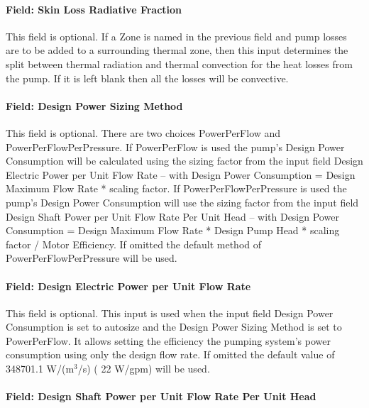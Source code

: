 \paragraph{Field: Skin Loss Radiative Fraction}\label{field-skin-loss-radiative-fraction-4}

This field is optional. If a Zone is named in the previous field and pump losses are to be added to a surrounding thermal zone, then this input determines the split between thermal radiation and thermal convection for the heat losses from the pump. If it is left blank then all the losses will be convective.

\paragraph{Field: Design Power Sizing Method}\label{field-design-power-sizing-method-4}

This field is optional. There are two choices PowerPerFlow and PowerPerFlowPerPressure. If PowerPerFlow is used the pump's Design Power Consumption will be calculated using the sizing factor from the input field Design Electric Power per Unit Flow Rate -- with Design Power Consumption = Design Maximum Flow Rate * scaling factor. If PowerPerFlowPerPressure is used the pump's Design Power Consumption will use the sizing factor from the input field Design Shaft Power per Unit Flow Rate Per Unit Head -- with Design Power Consumption = Design Maximum Flow Rate * Design Pump Head * scaling factor / Motor Efficiency. If omitted the default method of PowerPerFlowPerPressure will be used.

\paragraph{Field: Design Electric Power per Unit Flow Rate}\label{field-design-electric-power-per-unit-flow-rate-3}

This field is optional. This input is used when the input field Design Power Consumption is set to autosize and the Design Power Sizing Method is set to PowerPerFlow. It allows setting the efficiency the pumping system's power consumption using only the design flow rate. If omitted the default value of 348701.1 W/(m\(^{3}\)/s) ( 22 W/gpm) will be used.

\paragraph{Field: Design Shaft Power per Unit Flow Rate Per Unit Head}\label{field-design-shaft-power-per-unit-flow-rate-per-unit-head-4}

